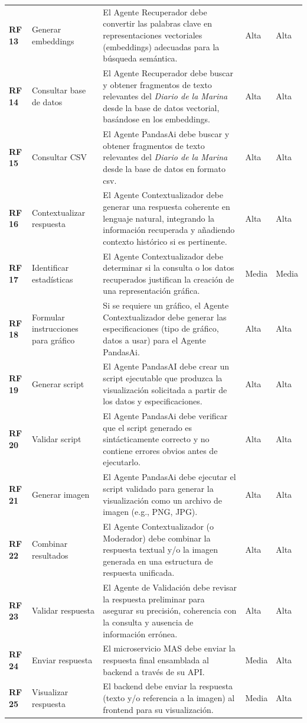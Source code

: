 \begin{longtable}{@{}l >{\raggedright\arraybackslash}p{4.5cm} >{\raggedright\arraybackslash}p{6.5cm} l l@{}}
	\textbf{RF 13} & Generar embeddings & El Agente Recuperador debe convertir las palabras clave en representaciones vectoriales (embeddings) adecuadas para la búsqueda semántica. & Alta & Alta \\ 
	\textbf{RF 14} & Consultar base de datos & El Agente Recuperador debe buscar y obtener fragmentos de texto relevantes del \textit{Diario de la Marina} desde la base de datos vectorial, basándose en los embeddings. & Alta & Alta \\
	\textbf{RF 15} & Consultar CSV & El Agente PandasAi debe buscar y obtener fragmentos de texto relevantes del \textit{Diario de la Marina} desde la base de datos en formato csv. & Alta & Alta \\ 
	\textbf{RF 16} & Contextualizar respuesta & El Agente Contextualizador debe generar una respuesta coherente en lenguaje natural, integrando la información recuperada y añadiendo contexto histórico si es pertinente. & Alta & Alta \\ 
	\textbf{RF 17} & Identificar estadísticas & El Agente Contextualizador debe determinar si la consulta o los datos recuperados justifican la creación de una representación gráfica. & Media & Media \\ 
	\textbf{RF 18} & Formular instrucciones para gráfico & Si se requiere un gráfico, el Agente Contextualizador debe generar las especificaciones (tipo de gráfico, datos a usar) para el Agente PandasAi. & Alta & Alta \\ 
	\textbf{RF 19} & Generar script & El Agente PandasAI debe crear un script ejecutable que produzca la visualización solicitada a partir de los datos y especificaciones. & Alta & Alta \\ 
	\textbf{RF 20} & Validar script & El Agente PandasAi debe verificar que el script generado es sintácticamente correcto y no contiene errores obvios antes de ejecutarlo. & Alta & Alta \\ 
	\textbf{RF 21} & Generar imagen & El Agente PandasAi debe ejecutar el script validado para generar la visualización como un archivo de imagen (e.g., PNG, JPG). & Alta & Alta \\ 
	\textbf{RF 22} & Combinar resultados & El Agente Contextualizador (o Moderador) debe combinar la respuesta textual y/o la imagen generada en una estructura de respuesta unificada. & Alta & Alta \\ 
	\textbf{RF 23} & Validar respuesta & El Agente de Validación debe revisar la respuesta preliminar para asegurar su precisión, coherencia con la consulta y ausencia de información errónea. & Alta & Alta \\  
	\textbf{RF 24} & Enviar respuesta & El microservicio MAS debe enviar la respuesta final ensamblada al backend a través de su API. & Media & Alta \\ 
	\textbf{RF 25} & Visualizar respuesta & El backend debe enviar la respuesta (texto y/o referencia a la imagen) al frontend para su visualización. & Media & Alta \\ 
	
\end{longtable}

